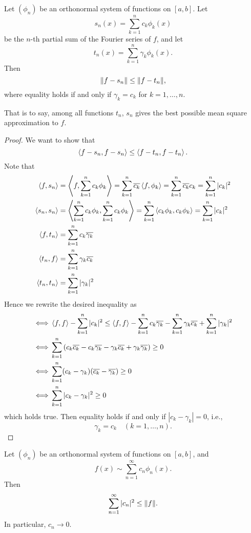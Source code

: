 \begin{proposition}
Let $(\phi_n)$ be an orthonormal system of functions on $[a,b]$. Let
\[s_n(x)=\sum_{k=1}^{n}c_k\phi_k(x)\]
be the $n$-th partial sum of the Fourier series of $f$, and let
\[t_n(x)=\sum_{k=1}^{n}\gamma_k\phi_k(x).\]
Then
\begin{equation}
\norm{f-s_n}\le\norm{f-t_n},
\end{equation}
where equality holds if and only if $\gamma_k=c_k$ for $k=1,\dots,n$.
\end{proposition}

That is to say, among all functions $t_n$, $s_n$ gives the best possible mean square approximation to $f$.

\begin{proof}
We want to show that
\[\left\langle f-s_n,f-s_n\right\rangle\le\left\langle f-t_n,f-t_n\right\rangle.\]
Note that
\begin{align*}
\left\langle f,s_n\right\rangle&=\left\langle f,\sum_{k=1}^{n}c_k\phi_k\right\rangle=\sum_{k=1}^{n}\overline{c_k}\left\langle f,\phi_k\right\rangle=\sum_{k=1}^{n}\overline{c_k}c_k=\sum_{k=1}^{n}|c_k|^2\\
\left\langle s_n,s_n\right\rangle&=\left\langle\sum_{k=1}^{n}c_k\phi_k,\sum_{k=1}^{n}c_k\phi_k\right\rangle=\sum_{k=1}^{n}\left\langle c_k\phi_k,c_k\phi_k\right\rangle=\sum_{k=1}^{n}|c_k|^2\\
\left\langle f,t_n\right\rangle&=\sum_{k=1}^{n}c_k\overline{\gamma_k}\\
\left\langle t_n,f\right\rangle&=\sum_{k=1}^{n}\gamma_k\overline{c_k}\\
\left\langle t_n,t_n\right\rangle&=\sum_{k=1}^{n}|\gamma_k|^2
\end{align*}
Hence we rewrite the desired inequality as
\begin{align*}
\iff&\left\langle f,f\right\rangle-\sum_{k=1}^{n}|c_k|^2\le\left\langle f,f\right\rangle-\sum_{k=1}^{n}c_k\overline{\gamma_k}-\sum_{k=1}^{n}\gamma_k\overline{c_k}+\sum_{k=1}^{n}|\gamma_k|^2\\
\iff&\sum_{k=1}^{n}\left(c_k\overline{c_k}-c_k\overline{\gamma_k}-\gamma_k\overline{c_k}+\gamma_k\overline{\gamma_k}\right)\ge0\\
\iff&\sum_{k=1}^{n}(c_k-\gamma_k)(\overline{c_k}-\overline{\gamma_k})\ge0\\
\iff&\sum_{k=1}^{n}|c_k-\gamma_k|^2\ge0
\end{align*}
which holds true. Then equality holds if and only if $|c_k-\gamma_k|=0$, i.e.,
\[\gamma_k=c_k\quad(k=1,\dots,n).\]
\end{proof}

\begin{proposition}
Let $(\phi_n)$ be an orthonormal system of functions on $[a,b]$, and
\[f(x)\sim\sum_{n=1}^{\infty}c_n\phi_n(x).\]
Then
\begin{equation}
\sum_{n=1}^{\infty}|c_n|^2\le\norm{f}.
\end{equation}
In particular, $c_n\to0$.
\end{proposition}

